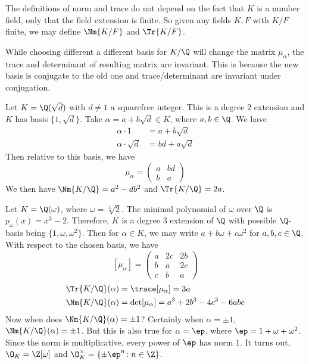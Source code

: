 \begin{rem}
The definitions of norm and trace do not depend on the fact that $K$ is a number field, only that the field extension is finite. So given any fields $K,F$ with $K/F$ finite, we may define $\Nm{K/F}$ and $\Tr{K/F}$. 
\end{rem}

\begin{rem}
While choosing different a different basis for $K/\Q$ will change the matrix $\mu_\alpha$, the trace and determinant of resulting matrix are invariant. This is because the new basis is conjugate to the old one and trace/determinant are invariant under conjugation.
\end{rem}

\begin{ex}
Let $K=\Q(\sqrt{d})$ with $d \neq 1$ a squarefree integer. This is a degree 2 extension and $K$ has basis $\{1,\sqrt{d}\}$. Take $\alpha= a+b\sqrt{d} \in K$, where $a,b \in \Q$. We have
	\[
	\begin{split}
	\alpha \cdot 1&= a+b\sqrt{d} \\
	\alpha \cdot \sqrt{d}&= bd+a\sqrt{d}
	\end{split}
	\]
Then relative to this basis, we have
	\[
	\mu_\alpha= \begin{pmatrix} a & bd \\ b & a \end{pmatrix}
	\]
We then have $\Nm{K/\Q}=a^2-db^2$ and $\Tr{K/\Q}=2a$. \xqed
\end{ex}

\begin{ex}
Let $K=\Q(\omega)$, where $\omega=\sqrt[3]{2}$. The minimal polynomial of $\omega$ over $\Q$ is $p_\omega(x)=x^3-2$. Therefore, $K$ is a degree 3 extension of $\Q$ with possible $\Q$-basis being $\{1,\omega,\omega^2\}$. Then for $\alpha \in K$, we may write $a+b\omega+c\omega^2$ for $a,b,c \in \Q$. With respect to the chosen basis, we have
	\[
	[\mu_\alpha]= \begin{pmatrix} a & 2c & 2b \\ b & a & 2c \\ c & b & a \end{pmatrix}
	\]
	\[
	\begin{split}
	\Tr{K/\Q}(\alpha)&=\trace[\mu_\alpha]=3a \\
	\Nm{K/\Q}(\alpha)&=\det[\mu_\alpha]=a^3+2b^3-4c^3-6abc
	\end{split}
	\]
Now when does $\Nm{K/\Q}(\alpha)=\pm1$? Certainly when $\alpha=\pm 1$, $\Nm{K/\Q}(\alpha)=\pm 1$. But this is also true for $\alpha=\ep$, where $\ep=1+\omega+\omega^2$. Since the norm is multiplicative, every power of $\ep$ has norm 1. It turns out, $\O_K=\Z[\omega]$ and $\O_K^\times=\{\pm \ep^n \colon n \in \Z\}$. \xqed
\end{ex}

